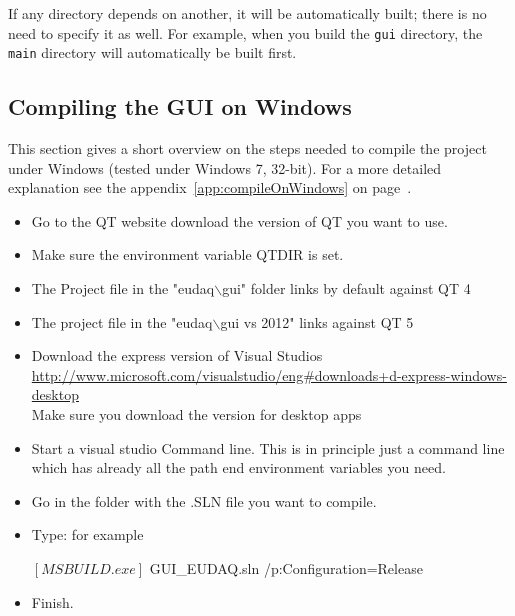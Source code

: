 If any directory depends on another, it will be automatically built; there is no need to specify it as well.
For example, when you build the \texttt{gui} directory, the \texttt{main} directory will automatically be built first.

\subsection{Compiling the GUI on Windows}

This section gives a short overview on the steps needed to compile the project under
Windows (tested under Windows 7, 32-bit). For a more detailed
explanation see the appendix~\ref{app:compileOnWindows} on page~\pageref{app:compileOnWindows}.

\begin{itemize}
      \item Go to the QT website download the version of QT you want to use.
      \item Make sure the environment variable QTDIR is set. 
      \item The Project file in the "eudaq\ensuremath{\backslash}gui" folder links by default against QT 4
      \item The project file in the "eudaq\ensuremath{\backslash}gui vs 2012" links against QT 5
      \item Download the express version of Visual Studios\\
      \url{http://www.microsoft.com/visualstudio/eng#downloads+d-express-windows-desktop}\\
      Make sure you download the version for desktop apps 
      \item Start a visual studio Command line. This is in principle just a command line which has already all the path end environment variables you need.
      \item Go in the folder with the .SLN file you want to compile. 
      \item Type: for example\\
      \begin{listing}[mybash]
$[MSBUILD.exe]$ GUI_EUDAQ.sln /p:Configuration=Release
\end{listing}
 
\item Finish.
    
\end{itemize}
